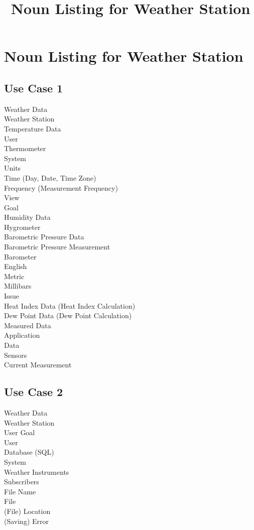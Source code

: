 \documentclass[letterpaper]{article}
\title{Noun Listing for Weather Station}
\begin{document}
\noindent
\section{Noun Listing for Weather Station}
\subsection{Use Case 1}
Weather Data\\
Weather Station\\
Temperature Data\\
User\\
Thermometer\\
System\\
Units\\
Time (Day, Date, Time Zone)\\
Frequency (Measurement Frequency)\\
View\\
Goal\\
Humidity Data\\
Hygrometer\\
Barometric Pressure Data\\
Barometric Pressure Measurement\\
Barometer\\
English\\
Metric\\
Millibars\\
Issue\\
Heat Index Data (Heat Index Calculation)\\
Dew Point Data (Dew Point Calculation)\\
Measured Data\\
Application\\
Data\\
Sensors\\
Current Measurement\\
\subsection{Use Case 2}
Weather Data\\
Weather Station\\
User Goal\\
User\\
Database (SQL)\\
System\\
Weather Instruments\\
Subscribers\\
File Name\\
File\\
(File) Location\\
(Saving) Error\\
\end{document}
